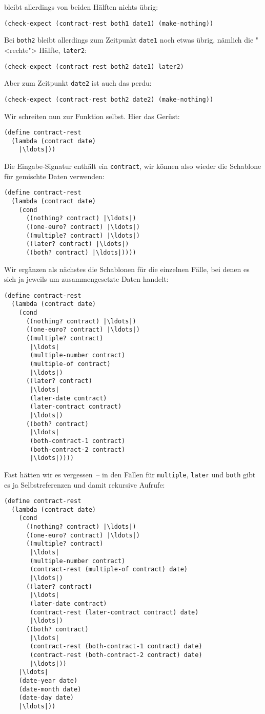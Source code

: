 bleibt allerdings von beiden Hälften nichts übrig:
%
\begin{lstlisting}
(check-expect (contract-rest both1 date1) (make-nothing))
\end{lstlisting}
%
Bei \lstinline{both2} bleibt allerdings zum Zeitpunkt
\lstinline{date1} noch etwas übrig, nämlich die "<rechte"> Hälfte,
\lstinline{later2}:
%
\begin{lstlisting}
(check-expect (contract-rest both2 date1) later2)
\end{lstlisting}
%
Aber zum Zeitpunkt \lstinline{date2} ist auch das perdu:
%
\begin{lstlisting}
(check-expect (contract-rest both2 date2) (make-nothing))
\end{lstlisting}
%
Wir schreiten nun zur Funktion selbst.  Hier das Gerüst:
%
\begin{lstlisting}
(define contract-rest
  (lambda (contract date)
    |\ldots|))
\end{lstlisting}
%
Die Eingabe-Signatur enthält ein \lstinline{contract}, wir können also
wieder die Schablone für gemischte Daten verwenden:
%
\begin{lstlisting}
(define contract-rest
  (lambda (contract date)
    (cond
      ((nothing? contract) |\ldots|)
      ((one-euro? contract) |\ldots|)
      ((multiple? contract) |\ldots|)
      ((later? contract) |\ldots|)
      ((both? contract) |\ldots|))))
\end{lstlisting}
%
Wir ergänzen als nächstes die Schablonen für die einzelnen Fälle, bei
denen es sich ja jeweils um zusammengesetzte Daten handelt:
%
\begin{lstlisting}
(define contract-rest
  (lambda (contract date)
    (cond
      ((nothing? contract) |\ldots|)
      ((one-euro? contract) |\ldots|)
      ((multiple? contract)
       |\ldots|
       (multiple-number contract)
       (multiple-of contract)
       |\ldots|)
      ((later? contract)
       |\ldots|
       (later-date contract)
       (later-contract contract)
       |\ldots|)
      ((both? contract)
       |\ldots|
       (both-contract-1 contract)
       (both-contract-2 contract)
       |\ldots|))))
\end{lstlisting}
%
%
Fast hätten wir es vergessen~-- in den Fällen für
\lstinline{multiple}, \lstinline{later} und \lstinline{both} gibt es
ja Selbstreferenzen und damit rekursive Aufrufe:
%
\begin{lstlisting}
(define contract-rest
  (lambda (contract date)
    (cond
      ((nothing? contract) |\ldots|)
      ((one-euro? contract) |\ldots|)
      ((multiple? contract)
       |\ldots|
       (multiple-number contract)
       (contract-rest (multiple-of contract) date)
       |\ldots|)
      ((later? contract)
       |\ldots|
       (later-date contract)
       (contract-rest (later-contract contract) date)
       |\ldots|)
      ((both? contract)
       |\ldots|
       (contract-rest (both-contract-1 contract) date)
       (contract-rest (both-contract-2 contract) date)
       |\ldots|))
    |\ldots|
    (date-year date)
    (date-month date)
    (date-day date)
    |\ldots|))
\end{lstlisting}
